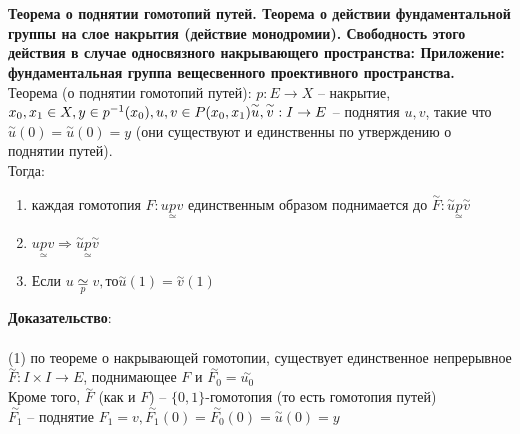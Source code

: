 \newpage
\section{} 
	\textbf{Теорема о поднятии гомотопий путей. Теорема о действии фундаментальной группы на слое накрытия (действие монодромии). Свободность этого действия в случае односвязного накрывающего пространства: Приложение: фундаментальная группа вещесвенного проективного пространства.}\\
	Теорема (о поднятии гомотопий путей): $p: E \rightarrow X$ -- накрытие, $x_0, x_1 \in X, y\in p^{-1} (x_0), u,v\in P(x_0,x_1)\\
	\overset{\sim}{u}, \overset{\sim}{v}: I \rightarrow E$ -- поднятия $u,v$, такие что $\overset{\sim}{u} (0) = \overset{\sim}{u} (0) = y$ (они существуют и единственны по утверждению о поднятии путей).\\
	Тогда:
	\begin{enumerate}
	\item каждая гомотопия $F: u \underset{\simeq}{p} v$ единственным образом поднимается до $\overset{\sim}{F}: \overset{\sim}{u} \underset{\simeq}{p}\overset{\sim}{v}$\\
	\item $ u \underset{\simeq}{p} v \Rightarrow \overset{\sim}{u} \underset{\simeq}{p}\overset{\sim}{v}$\\
	\item Если $u \underset{p}{\simeq} v, то \overset{\sim}{u} (1) = \overset{\sim}{v} (1)$\\
		\begin{comment}
		\begin{figure}[h]
		\center{\texttt{[image: 15-1.png]}}
		\end{figure}\\
		\end{comment}
	\end{enumerate}
	\textbf{Доказательство}:\\ 
	\\
	(1) по теореме о накрывающей гомотопии, существует единственное непрерывное $\overset{\sim}{F}: I\times I \rightarrow E$, поднимающее $F$ и $\overset{\sim}{F_0} = \overset{\sim}{u_0}$\\
	Кроме того, $\overset{\sim}{F}$ (как и $F$) -- $\{0,1\}$-гомотопия (то есть гомотопия путей)\\
	$\overset{\sim}{F_1}$ -- поднятие $F_1 = v, \overset{\sim}{F_1} (0) = \overset{\sim}{F_0} (0) = \overset{\sim}{u} (0) = y$\\

